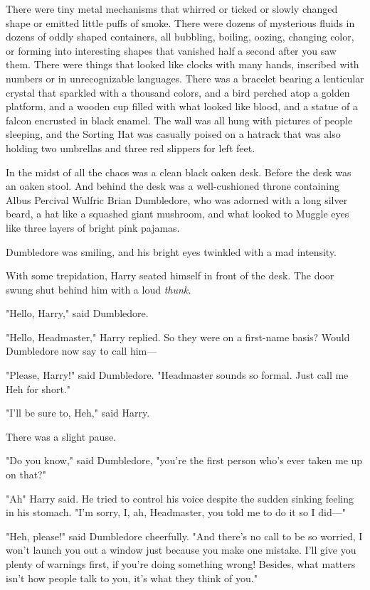 There were tiny metal mechanisms that whirred or ticked or slowly changed shape
or emitted little puffs of smoke. There were dozens of mysterious fluids in
dozens of oddly shaped containers, all bubbling, boiling, oozing, changing
color, or forming into interesting shapes that vanished half a second after you
saw them. There were things that looked like clocks with many hands, inscribed
with numbers or in unrecognizable languages. There was a bracelet bearing a
lenticular crystal that sparkled with a thousand colors, and a bird perched
atop a golden platform, and a wooden cup filled with what looked like blood,
and a statue of a falcon encrusted in black enamel. The wall was all hung with
pictures of people sleeping, and the Sorting Hat was casually poised on a
hatrack that was also holding two umbrellas and three red slippers for left
feet.

In the midst of all the chaos was a clean black oaken desk. Before the desk was
an oaken stool. And behind the desk was a well-cushioned throne containing
Albus Percival Wulfric Brian Dumbledore, who was adorned with a long silver
beard, a hat like a squashed giant mushroom, and what looked to Muggle eyes
like three layers of bright pink pajamas.

Dumbledore was smiling, and his bright eyes twinkled with a mad intensity.

With some trepidation, Harry seated himself in front of the desk. The door
swung shut behind him with a loud \emph{thunk.}

"Hello, Harry," said Dumbledore.

"Hello, Headmaster," Harry replied. So they were on a first-name basis? Would
Dumbledore now say to call him\mbox{---}

"Please, Harry!" said Dumbledore. "Headmaster sounds so formal. Just call me
Heh for short."

"I'll be sure to, Heh," said Harry.

There was a slight pause.

"Do you know," said Dumbledore, "you're the first person who's ever taken me up
on that?"

"Ah{\el}" Harry said. He tried to control his voice despite the sudden
sinking feeling in his stomach. "I'm sorry, I, ah, Headmaster, you told me to
do it so I did\mbox{---}"

"Heh, please!" said Dumbledore cheerfully. "And there's no call to be so
worried, I won't launch you out a window just because you make one mistake.
I'll give you plenty of warnings first, if you're doing something wrong!
Besides, what matters isn't how people talk to you, it's what they think of
you."

